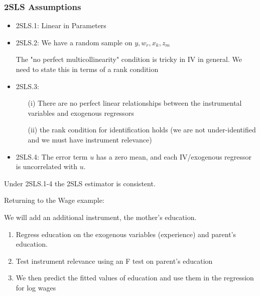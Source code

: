 \documentclass[11pt]{article}
\begin{document}
\begin{shaded}
    \subsubsection{2SLS Assumptions}

    \begin{itemize}
        \item 2SLS.1: Linear in Parameters
        \item 2SLS.2: We have a random sample on $y, w_r, x_k, z_m$
        \begin{note}
            The "no perfect multicollinearity" condition is tricky in IV in general. We need to state this in terms of a rank condition
        \end{note}
        \item 2SLS.3:
        \begin{enumerate}
            \item [(i)] There are no perfect linear relationships between the instrumental variables and exogenous regressors
            \item [(ii)] the rank condition for identification holds (we are not under-identified and we must have instrument relevance)
        \end{enumerate}
        \item 2SLS.4: The error term $u$ has a zero mean, and each IV/exogenous regressor is uncorrelated with $u$.
    \end{itemize}

    Under 2SLS.1-4 the 2SLS estimator is consistent.
\end{shaded}

\begin{example}
    Returning to the Wage example:

    We will add an additional instrument, the mother's education. 
    
    \begin{procedure}
    \begin{enumerate}
        \item Regress education on the exogenous variables (experience) and parent's education.
        \item Test instrument relevance using an F test on parent's education
        \item We then predict the fitted values of education and use them in the regression for log wages
    \end{enumerate}
    \end{procedure}
\end{example}
\end{document}
